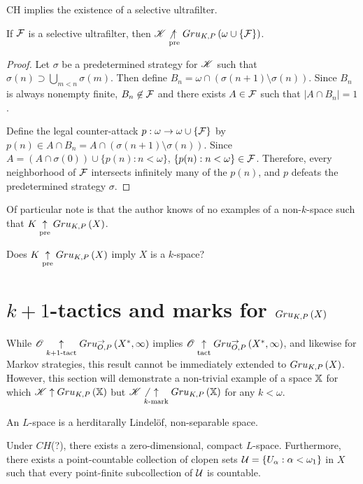 \begin{thm}
  CH implies the existence of a selective ultrafilter.
  \cite{MR0080902}
\end{thm}

\begin{thm}
  If $\mathcal{F}$ is a selective ultrafilter, then
  $\mathscr{K}\not\underset{\text{pre}}{\uparrow} Gru_{K,P}\left({\omega\cup\{\mathcal{F}\}}\right)$.
\end{thm}

\begin{proof}
  Let $\sigma$ be a predetermined strategy for $\mathscr{K}$ such that
  $\sigma(n)\supset\bigcup_{m<n}\sigma(m)$.
  Then define $B_n=\omega\cap(\sigma(n+1)\setminus\sigma(n))$. Since $B_n$
  is always nonempty finite, $B_n\not\in\mathcal{F}$ and there exists $A\in \mathcal{F}$
  such that $|A\cap B_n|=1$.

  Define the legal counter-attack $p:\omega\to\omega\cup\{\mathcal{F}\}$ by
  $p(n)\in A\cap B_n=A\cap(\sigma(n+1)\setminus\sigma(n))$. Since
  $A=(A\cap\sigma(0))\cup\{p(n):n<\omega\}$, $\{p(n):n<\omega\}\in\mathcal{F}$.
  Therefore, every neighborhood of $\mathcal{F}$ intersects infinitely many of
  the $p(n)$, and $p$ defeats the predetermined strategy $\sigma$.
\end{proof}

Of particular note is that the author knows of no examples of a
non-$k$-space such that $K\underset{\text{pre}}{\uparrow}Gru_{K,P}\left({X}\right)$.

\begin{ques}
  Does $K\underset{\text{pre}}{\uparrow}Gru_{K,P}\left({X}\right)$ imply $X$ is a $k$-space?
\end{ques}


\section{$k+1$-tactics and marks for $Gru_{K,P}\left({X}\right)$}

While $\mathscr{O}\underset{k+1\text{-tact}}{\uparrow}Gru_{O,P}^{\to}\left({X^*},{\infty}\right)$ implies
$\mathscr{O}\underset{\text{tact}}{\uparrow}Gru_{O,P}^{\to}\left({X^*},{\infty}\right)$, and likewise for Markov
strategies, this result cannot be
immediately extended to $Gru_{K,P}\left({X}\right)$. However, this section will
demonstrate a non-trivial example of a space $\mathbb{X}$ for which
$\mathscr{K}\uparrow Gru_{K,P}\left({\mathbb{X}}\right)$ but $\mathscr{K}\not\underset{k\text{-mark}}{\uparrow}Gru_{K,P}\left({\mathbb{X}}\right)$
for any $k<\omega$.

\begin{defn}
  An $L$-space is a herditarally Lindel\"of, non-separable space.
\end{defn}

\begin{thm}
  Under $CH$(?), there exists a zero-dimensional, compact $L$-space.
  Furthermore, there exists a point-countable collection of clopen sets
  $\mathcal{U}=\{U_\alpha:\alpha<\omega_1\}$ in $X$ such
  that every point-finite subcollection of $\mathcal{U}$ is countable.
\end{thm}

